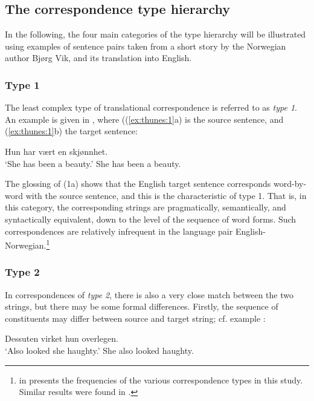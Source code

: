 \documentclass[output=paper]{LSP/langsci}
\begin{document}
\subsection{The correspondence type hierarchy}\label{sec:thunes:3.1}

In the following, the four main categories of the type hierarchy will be illustrated using examples of sentence pairs taken from a short story by the Norwegian author Bjørg Vik, and its translation into English. 

\subsubsection{Type 1}\label{sec:thunes:3.1.1}
\largerpage
The least complex type of translational correspondence is referred to as \textit{type 1}. An example is given in , where ((\ref{ex:thunes:1}a) is the source sentence, and (\ref{ex:thunes:1}b) the target sentence:

\ea \label{ex:thunes:1}
    \ea
 Hun har vært en skjønnhet.\\
  `She has been a beauty.' 
     \ex 
  She has been a beauty.
     \z
\z

The glossing of (1a) shows that the English target sentence corresponds word-by-word with the source sentence, and this is the characteristic of type 1. That is, in this category, the corresponding strings are pragmatically, semantically, and syntactically equivalent, down to the level of the sequence of word forms. Such correspondences are relatively infrequent in the language pair English-Norwegian.\footnote{  in  presents the frequencies of the various correspondence types in this study. Similar results were found in \citet{Thunes1998}.} 


\subsubsection{Type 2}\label{sec:thunes:3.1.2}

In correspondences of \textit{type 2}, there is also a very close match between the two strings, but there may be some formal differences. Firstly, the sequence of constituents may differ between source and target string; cf. example :

\ea \label{ex:thunes:2}
    \ea
Dessuten virket hun overlegen.\\
 `Also looked she haughty.' 
    \ex
She also looked haughty.
    \z
\z
\end{document}

